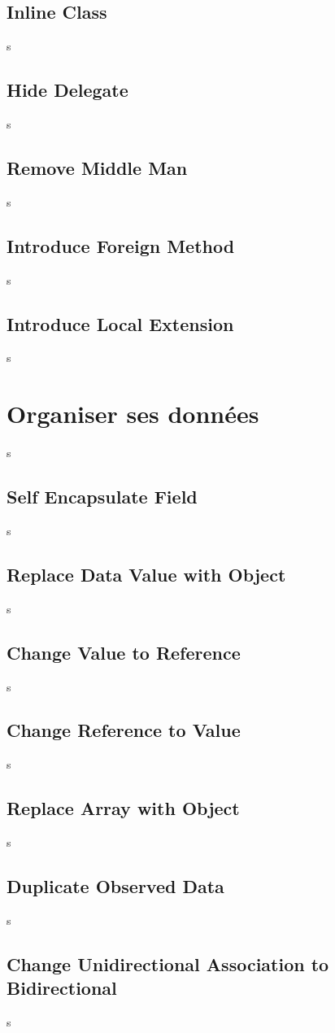 \documentclass[a4paper,twoside,12pt,openright]{report}
\begin{document}
\subsection{Inline Class}
s
\subsection{Hide Delegate}
s
\subsection{Remove Middle Man}
s
\subsection{Introduce Foreign Method}
s
\subsection{Introduce Local Extension}
s



\newpage
\section{Organiser ses données}
s
\subsection{Self Encapsulate Field}
s
\subsection{Replace Data Value with Object}
s
\subsection{Change Value to Reference}
s
\subsection{Change Reference to Value}
s
\subsection{Replace Array with Object}
s
\subsection{Duplicate Observed Data}
s
\subsection{Change Unidirectional Association to Bidirectional}
s
\end{document}
